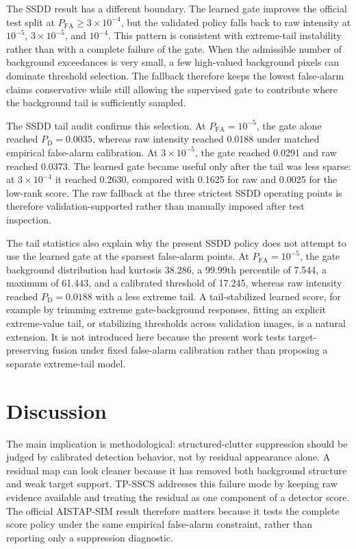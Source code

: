 \documentclass[journal]{IEEEtran}
\begin{document}
The SSDD result has a different boundary. The learned gate improves the official test split at $P_{\mathrm{FA}}\geq3\times10^{-4}$, but the validated policy falls back to raw intensity at $10^{-5}$, $3\times10^{-5}$, and $10^{-4}$. This pattern is consistent with extreme-tail instability rather than with a complete failure of the gate. When the admissible number of background exceedances is very small, a few high-valued background pixels can dominate threshold selection. The fallback therefore keeps the lowest false-alarm claims conservative while still allowing the supervised gate to contribute where the background tail is sufficiently sampled.

The SSDD tail audit confirms this selection. At $P_{\mathrm{FA}}=10^{-5}$, the gate alone reached $P_{\mathrm{D}}=0.0035$, whereas raw intensity reached 0.0188 under matched empirical false-alarm calibration. At $3\times10^{-5}$, the gate reached 0.0291 and raw reached 0.0373. The learned gate became useful only after the tail was less sparse: at $3\times10^{-4}$ it reached 0.2630, compared with 0.1625 for raw and 0.0025 for the low-rank score. The raw fallback at the three strictest SSDD operating points is therefore validation-supported rather than manually imposed after test inspection.

The tail statistics also explain why the present SSDD policy does not attempt to use the learned gate at the sparsest false-alarm points. At $P_{\mathrm{FA}}=10^{-5}$, the gate background distribution had kurtosis 38.286, a 99.99th percentile of 7.544, a maximum of 61.443, and a calibrated threshold of 17.245, whereas raw intensity reached $P_{\mathrm{D}}=0.0188$ with a less extreme tail. A tail-stabilized learned score, for example by trimming extreme gate-background responses, fitting an explicit extreme-value tail, or stabilizing thresholds across validation images, is a natural extension. It is not introduced here because the present work tests target-preserving fusion under fixed false-alarm calibration rather than proposing a separate extreme-tail model.

\section{Discussion}

The main implication is methodological: structured-clutter suppression should be judged by calibrated detection behavior, not by residual appearance alone. A residual map can look cleaner because it has removed both background structure and weak target support. TP-SSCS addresses this failure mode by keeping raw evidence available and treating the residual as one component of a detector score. The official AISTAP-SIM result therefore matters because it tests the complete score policy under the same empirical false-alarm constraint, rather than reporting only a suppression diagnostic.
\end{document}
